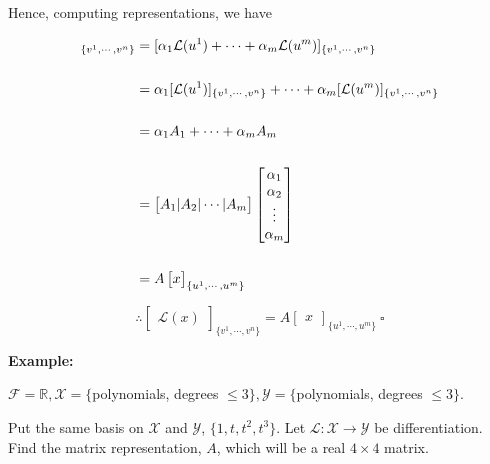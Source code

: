 \documentclass[letterpaper]{article}
\begin{document}
    Hence, computing representations, we have

    \begin{align*}
        [\mathcal{L}(x)]_{ \{v^1,\dotsb,v^n\}}  &= [\alpha_1 \mathcal{L}(u^1) + \dotsb + \alpha_m \mathcal{L}(u^m) ]_{ \{v^1,\dotsb,v^n\}} \bigskip\\
        \\
        & = \alpha_1 [\mathcal{L}(u^1)]_{ \{v^1,\dotsb,v^n\}} + \cdots  + \alpha_m [\mathcal{L}(u^m)]_{ \{v^1,\dotsb,v^n\}} \bigskip \\
        \\
        &= \alpha_1 A_1 + \cdots + \alpha_m A_m \\
        \\
        & = \begin{bmatrix} A_1 | A_2 | \dotsb | A_m \end{bmatrix} \begin{bmatrix}\alpha_1 \\ \alpha_2 \\ \vdots \\ \alpha_m \end{bmatrix} \\
        \\
        &= A \begin{bmatrix} x \end{bmatrix}_{ \{u^1,\dotsb,u^m\} }
    \end{align*}

    $$ \therefore \begin{bmatrix} \mathcal{L}(x) \end{bmatrix}_{ \{v^1,\dotsb,v^n\} } = A \begin{bmatrix} x \end{bmatrix}_{ \{u^1,\dotsb,u^m\} }\ \square$$

\newpage
\noindent \textbf{Example:}~

    $\mathcal{F} = \mathbb{R}, \mathcal{X} = \{ $polynomials, degrees $\leq 3 \}, \mathcal{Y} = \{$polynomials, degrees $ \leq 3 \}$.

    Put the same basis on $\mathcal{X}$ and $\mathcal{Y}$, $\{ 1, t, t^2, t^3\}$.  Let $\mathcal{L}: \mathcal{X} \rightarrow \mathcal{Y}$ be differentiation. Find the matrix representation, $A$, which will be a real $4 \times 4$ matrix.
\end{document}
